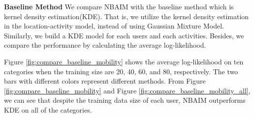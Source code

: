 \begin{figure*}[!ht]
\centering
{}
\caption{Comparison of location inference methods}
\label{fig:compare_baseline_mobility}
\end{figure*}


{\bf Baseline Method}
We compare NBAIM with the baseline method which is kernel density estimation(KDE). That is, we utilize the kernel density estimation in the location-activity model, instead of using Gaussian Mixture Model. Similarly, we build a KDE model for each users and each activities. Besides, we compare the performance by calculating the average log-likelihood.

Figure \ref{fig:compare_baseline_mobility} shows the average log-likelihood on ten categories when the training size are 20, 40, 60, and 80, respectively. The two bars with different colors represent different methods. From Figure \ref{fig:compare_baseline_mobility} and Figure \ref{fig:compare_baseline_mobility_all}, we can see that despite the training data size of each user, NBAIM outperforms KDE on all of the categories.

